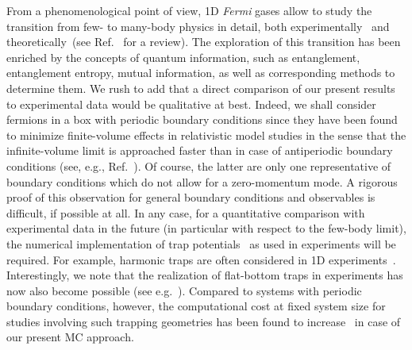 \documentclass[pra,aps,groupedaddress,floatfix,twocolumn,superscriptaddress,showpacs,nofootinbib]{revtex4-1}
\begin{document}
{{From a phenomenological point of view, 1D {\it Fermi} gases allow to study the transition from few- to many-body physics in detail, both
experimentally~\cite{2013Sci...342..457W,*2013PhRvL.111q5302Z} and theoretically~(see Ref.~\cite{2016EPJWC.11301002Z} for a review).
The exploration of this transition has been enriched by
the concepts of quantum information, such as entanglement, entanglement entropy, mutual information,
as well as corresponding methods to determine them.
We rush to add that a direct comparison of our present results to experimental data would be qualitative at best. Indeed,
we shall consider fermions in a box with periodic boundary conditions {since they have been found
to minimize finite-volume effects in relativistic model studies in the sense that the infinite-volume limit is approached faster than
in case of antiperiodic boundary conditions (see, e.g., Ref.~\cite{Braun:2005gy}). Of course, the latter are only one
representative of boundary conditions which do not allow for a zero-momentum mode. A
rigorous proof of this observation for general boundary conditions
and observables is
difficult, if possible at all.
In any case, for a quantitative comparison with experimental data in the future (in particular with respect to the few-body limit),
the} numerical implementation of trap potentials~\cite{Berger2014, Berger2015} as used in experiments will be required.
For example, harmonic traps are often
considered in 1D experiments~\cite{2013Sci...342..457W,*2013PhRvL.111q5302Z}. Interestingly, we note that
the realization of flat-bottom traps in experiments has now also become possible (see e.g.~\cite{Hueck2017}).
Compared to systems with periodic boundary conditions, however,
the computational cost at fixed system size for studies involving such trapping geometries has been found
to increase~\cite{Berger2015,McKenney:2015gba} in case of our present MC approach.}

}
\end{document}

